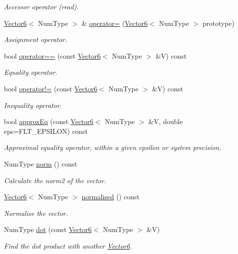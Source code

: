 \begin{DoxyCompactItemize}
\begin{DoxyCompactList}\small\item\em Accessor operator (read). \end{DoxyCompactList}\item 
\hyperlink{singletonscrews_1_1_vector6}{Vector6}$<$ Num\+Type $>$ \& \hyperlink{singletonscrews_1_1_vector6_a60d13f9b6a908924aebe3404625b2d50}{operator=} (\hyperlink{singletonscrews_1_1_vector6}{Vector6}$<$ Num\+Type $>$ prototype)
\begin{DoxyCompactList}\small\item\em Assignment operator. \end{DoxyCompactList}\item 
bool \hyperlink{singletonscrews_1_1_vector6_a4d32b549c161a616b36c057cef5d0edd}{operator==} (const \hyperlink{singletonscrews_1_1_vector6}{Vector6}$<$ Num\+Type $>$ \&V) const 
\begin{DoxyCompactList}\small\item\em Equality operator. \end{DoxyCompactList}\item 
bool \hyperlink{singletonscrews_1_1_vector6_a77fe5947c453bfb77d517d587bd759e1}{operator!=} (const \hyperlink{singletonscrews_1_1_vector6}{Vector6}$<$ Num\+Type $>$ \&V) const 
\begin{DoxyCompactList}\small\item\em Inequality operator. \end{DoxyCompactList}\item 
bool \hyperlink{singletonscrews_1_1_vector6_a99ff44e2bcfc11c1fe1f80e616a30ccd}{approx\+Eq} (const \hyperlink{singletonscrews_1_1_vector6}{Vector6}$<$ Num\+Type $>$ \&V, double eps=F\+L\+T\+\_\+\+E\+P\+S\+I\+L\+O\+N) const 
\begin{DoxyCompactList}\small\item\em Approximal equality operator, within a given epsilon or system precision. \end{DoxyCompactList}\item 
Num\+Type \hyperlink{singletonscrews_1_1_vector6_a9ff682944090f4e12d38115f93ba07c1}{norm} () const 
\begin{DoxyCompactList}\small\item\em Calculate the norm2 of the vector. \end{DoxyCompactList}\item 
\hyperlink{singletonscrews_1_1_vector6}{Vector6}$<$ Num\+Type $>$ \hyperlink{singletonscrews_1_1_vector6_af3b35de01e4809ef66cf8acbc2d16b98}{normalised} () const 
\begin{DoxyCompactList}\small\item\em Normalise the vector. \end{DoxyCompactList}\item 
Num\+Type \hyperlink{singletonscrews_1_1_vector6_af72acbd975f6ad24e46fe28f68e43be4}{dot} (const \hyperlink{singletonscrews_1_1_vector6}{Vector6}$<$ Num\+Type $>$ \&V)
\begin{DoxyCompactList}\small\item\em Find the dot product with another \hyperlink{singletonscrews_1_1_vector6}{Vector6}. \end{DoxyCompactList}\end{DoxyCompactItemize}
